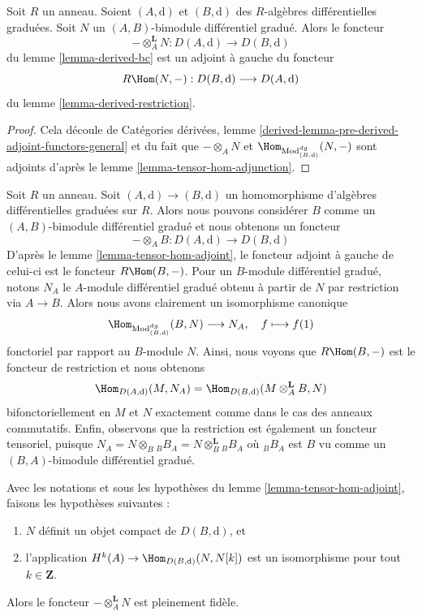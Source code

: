 \begin{lemma}
\label{lemma-tensor-hom-adjoint}
Soit $R$ un anneau.
Soient $(A, \text{d})$ et $(B, \text{d})$ des $R$-algèbres différentielles
graduées. Soit $N$ un $(A, B)$-bimodule différentiel gradué.
Alors le foncteur
$$
- \otimes_A^\mathbf{L} N : D(A, \text{d}) \longrightarrow D(B, \text{d})
$$
du lemme \ref{lemma-derived-bc} est un adjoint à gauche du foncteur
$$
R\Hom(N, -) : D(B, \text{d}) \longrightarrow D(A, \text{d})
$$
du lemme \ref{lemma-derived-restriction}.
\end{lemma}

\begin{proof}
Cela découle de Catégories dérivées, lemme
\ref{derived-lemma-pre-derived-adjoint-functors-general} et
du fait que $- \otimes_A N$ et
$\Hom_{\text{Mod}^{dg}_{(B, \text{d})}}(N, -)$ sont adjoints d'après le
lemme \ref{lemma-tensor-hom-adjunction}.
\end{proof}

\begin{example}
\label{example-map-hom-tensor}
Soit $R$ un anneau. Soit $(A, \text{d}) \to (B, \text{d})$ un
homomorphisme d'algèbres différentielles graduées sur $R$. Alors nous pouvons
considérer $B$ comme un $(A, B)$-bimodule différentiel gradué et nous obtenons un foncteur
$$
- \otimes_A B : D(A, \text{d}) \longrightarrow D(B, \text{d})
$$
D'après le lemme \ref{lemma-tensor-hom-adjoint}, le foncteur adjoint à
gauche de celui-ci est le foncteur $R\Hom(B, -)$. Pour un $B$-module
différentiel gradué, notons $N_A$ le $A$-module différentiel gradué obtenu à partir
de $N$ par restriction via $A \to B$. Alors nous avons clairement
un isomorphisme canonique
$$
\Hom_{\text{Mod}^{dg}_{(B, \text{d})}}(B, N) \longrightarrow N_A,\quad
f \longmapsto f(1)
$$
fonctoriel par rapport au $B$-module $N$. Ainsi, nous voyons
que $R\Hom(B, -)$ est le foncteur de restriction et nous obtenons
$$
\Hom_{D(A, \text{d})}(M, N_A) =
\Hom_{D(B, \text{d})}(M \otimes^\mathbf{L}_A B, N)
$$
bifonctoriellement en $M$ et $N$ exactement comme dans le cas des anneaux
commutatifs. Enfin, observons que la restriction est également un foncteur
tensoriel, puisque $N_A = N \otimes_B {}_BB_A = N \otimes_B^\mathbf{L}
{}_BB_A$ où ${}_BB_A$ est $B$ vu comme un $(B, A)$-bimodule différentiel gradué.
\end{example}

\begin{lemma}
\label{lemma-tensor-with-compact-fully-faithful}
Avec les notations et sous les hypothèses du lemme \ref{lemma-tensor-hom-adjoint}, faisons les hypothèses
suivantes :
\begin{enumerate}
\item $N$ définit un objet compact de $D(B, \text{d})$, et
\item l'application $H^k(A) \to \Hom_{D(B, \text{d})}(N, N[k])$ est
un isomorphisme pour tout $k \in \mathbf{Z}$.
\end{enumerate}
Alors le foncteur $-\otimes_A^\mathbf{L} N$ est pleinement fidèle.
\end{lemma}

